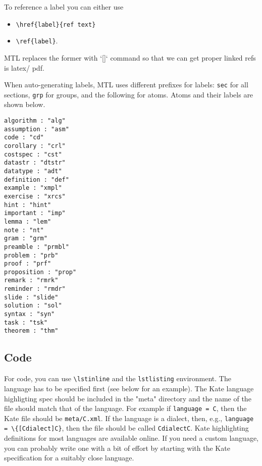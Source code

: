 \begin{gram}[References]
To reference a label you can either use
\begin{itemize}
\item \lstinline`\href{label}{ref text}`
\item \lstinline`\ref{label}`.
\end{itemize}
%
MTL replaces the former with `\hyperref[][]` command so that we can get proper linked refs is latex/ pdf.
\end{gram}


When auto-generating labels, MTL uses different prefixes for labels: \lstinline`sec` for all sections, \lstinline`grp` for groups, and the following for atoms.   Atoms and their labels are shown below.
%
\begin{lstlisting}
algorithm : "alg"
assumption : "asm"
code : "cd"
corollary : "crl"
costspec : "cst"
datastr : "dtstr"
datatype : "adt"
definition : "def"
example : "xmpl"
exercise : "xrcs"
hint : "hint"
important : "imp"
lemma : "lem"
note : "nt"
gram : "grm"
preamble : "prmbl"
problem : "prb"
proof : "prf"
proposition : "prop"
remark : "rmrk"
reminder : "rmdr"
slide : "slide"
solution : "sol"
syntax : "syn"
task : "tsk"
theorem : "thm"
\end{lstlisting}

\subsection{Code}
\label{sec:mtl::code}
For code, you can use \lstinline`\lstinline` and the \lstinline`lstlisting` environment.  The language has to be specified first (see below for an example).  The Kate language highligting spec should be included in the "meta" directory and the name of the file should match that of the language.  For example if \lstinline`language = C`, then the Kate file should be \lstinline`meta/C.xml`.  If the language is a dialect, then, e.g., \lstinline`language = \{[Cdialect]C}`, then the file should be called \lstinline`CdialectC`.  
%
Kate highlighting definitions for most languages are available online.
%
If you need a custom language, you can probably write one with a bit of effort by starting with the Kate specification for a  suitably close language.

